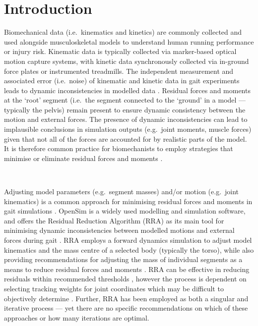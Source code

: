 \documentclass[]{elsarticle} %
\begin{document}
\hypertarget{introduction}{%
\section{Introduction}\label{introduction}}

Biomechanical data (i.e.~kinematics and kinetics) are commonly collected
and used alongside musculoskeletal models to understand human running
performance or injury risk. Kinematic data is typically collected via
marker-based optical motion capture systems, with kinetic data
synchronously collected via in-ground force plates or instrumented
treadmills. The independent measurement and associated error
(i.e.~noise) of kinematic and kinetic data in gait experiments leads to
dynamic inconsistencies in modelled data \citep{Hicks2015}. Residual
forces and moments at the `root' segment (i.e.~the segment connected to
the `ground' in a model --- typically the pelvis) remain present to
ensure dynamic consistency between the motion and external forces. The
presence of dynamic inconsistencies can lead to implausible conclusions
in simulation outputs (e.g.~joint moments, muscle forces) given that not
all of the forces are accounted for by realistic parts of the model. It
is therefore common practice for biomechanists to employ strategies that
minimise or eliminate residual forces and moments \citep{Hicks2015}.

~

Adjusting model parameters (e.g.~segment masses) and/or motion
(e.g.~joint kinematics) is a common approach for minimising residual
forces and moments in gait simulations \citep{Hicks2015, Werling2023}.
OpenSim is a widely used modelling and simulation software, and offers
the Residual Reduction Algorithm (RRA) as its main tool for minimising
dynamic inconsistencies between modelled motions and external forces
during gait \citep{Delp2007}. RRA employs a forward dynamics simulation
to adjust model kinematics and the mass centre of a selected body
(typically the torso), while also providing recommendations for
adjusting the mass of individual segments as a means to reduce residual
forces and moments \citep{NCSRR2017}. RRA can be effective in reducing
residuals within recommended thresholds \citep{Hicks2015}, however the
process is dependent on selecting tracking weights for joint coordinates
which may be difficult to objectively determine
\citep{Samaan2016, Sturdy2022}. Further, RRA has been employed as both a
singular \citep{Hamner2013} and iterative \citep{Rajagopal2016} process
--- yet there are no specific recommendations on which of these
approaches or how many iterations are optimal.
\end{document}
